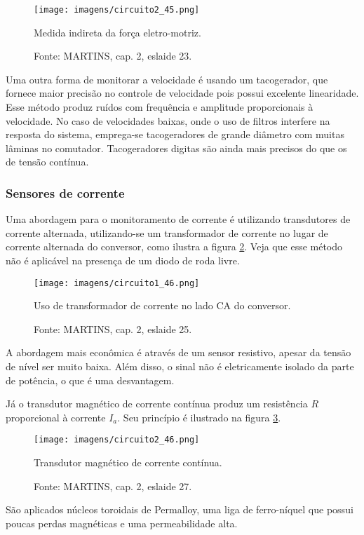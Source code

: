 \begin{figure}[ht!]
\center
\texttt{[image: imagens/circuito2\_45.png]}
\caption{\label{fig:C2_45} Medida indireta da força eletro-motriz.}
\caption*{Fonte: MARTINS, cap. 2, eslaide 23.}
\end{figure} 

Uma outra forma de monitorar a velocidade é usando um tacogerador, que fornece maior precisão no controle de velocidade pois possui excelente linearidade. Esse método produz ruídos com frequência e amplitude proporcionais à velocidade. No caso de velocidades baixas, onde o uso de filtros interfere na resposta do sistema, emprega-se tacogeradores de grande diâmetro com muitas lâminas no comutador. Tacogeradores digitas são ainda mais precisos do que os de tensão contínua.

\subsubsection{Sensores de corrente}

Uma abordagem para o monitoramento de corrente é utilizando transdutores de corrente alternada, utilizando-se um transformador de corrente no lugar de corrente alternada do conversor, como ilustra a figura \ref{fig:C1_46}. Veja que esse método não é aplicável na presença de um diodo de roda livre.

\begin{figure}[ht!]
\center
\texttt{[image: imagens/circuito1\_46.png]}
\caption{\label{fig:C1_46}Uso de transformador de corrente no lado CA do conversor.}
\caption*{Fonte: MARTINS, cap. 2, eslaide 25.}
\end{figure} 

A abordagem mais econômica é através de um sensor resistivo, apesar da tensão de nível ser muito baixa. Além disso, o sinal não é eletricamente isolado da parte de potência, o que é uma desvantagem.

Já o transdutor magnético de corrente contínua produz um resistência $R$ proporcional à corrente $I_{a}$. Seu princípio é ilustrado na figura \ref{fig:C2_46}.

\begin{figure}[ht!]
\center
\texttt{[image: imagens/circuito2\_46.png]}
\caption{\label{fig:C2_46} Transdutor magnético de corrente contínua.}
\caption*{Fonte: MARTINS, cap. 2, eslaide 27.}
\end{figure} 

São aplicados núcleos toroidais de Permalloy, uma liga de ferro-níquel que possui poucas perdas magnéticas e uma permeabilidade alta.

